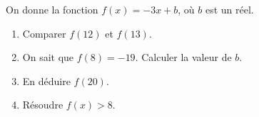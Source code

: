 
On donne la fonction $f(x)=-3x+b$, où $b$ est un réel.
\begin{enumerate}
\item Comparer $f(12)$ et $f(13)$.
\item On sait que $f(8)=-19$. Calculer la valeur de $b$.
\item En déduire $f(20)$.
\item Résoudre $f(x)>8$.
\end{enumerate}